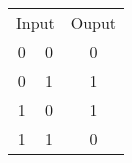 \documentclass{standalone}
\begin{document}
\begin{tabular}{ccc}
	\toprule
		\multicolumn{2}{c}{Input} & Ouput\\
	\cmidrule(r){1-2} \cmidrule(l){3-3}
		0 & 0 & 0\\
		0 & 1 & 1\\
		1 & 0 & 1\\
		1 & 1 & 0\\
	\bottomrule
\end{tabular}
\end{document}
